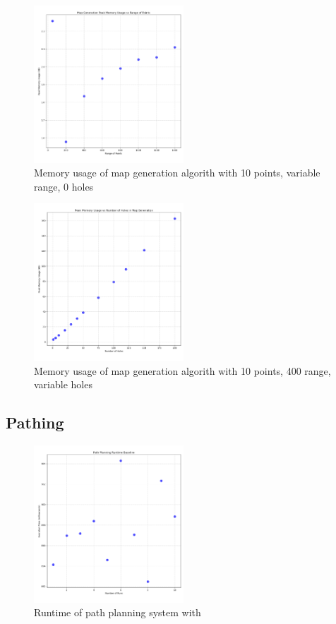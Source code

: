 \documentclass[final]{cmpreport_02}
\begin{document}
\begin{figure}[h!]
	\centering
	\includegraphics[width=0.5\textwidth]{./images/mapGenRangeMem.png}
	\caption{Memory usage of map generation algorith with 10 points, variable range, 0 holes}
	\label{PE:mg:memRange}
\end{figure}

\begin{figure}[h!]
	\centering
	\includegraphics[width=0.5\textwidth]{./images/mapGenHolesMem.png}
	\caption{Memory usage of map generation algorith with 10 points, 400 range, variable holes}
	\label{PE:mg:memHoles}
\end{figure}


\subsection{Pathing}
\begin{figure}[h!]
	\centering
	\includegraphics[width=0.5\textwidth]{./images/pathingBaseLineRT.png}
	\caption{Runtime of path planning system with }
	\label{PE:p:BaselineRT}
\end{figure}
\end{document}
